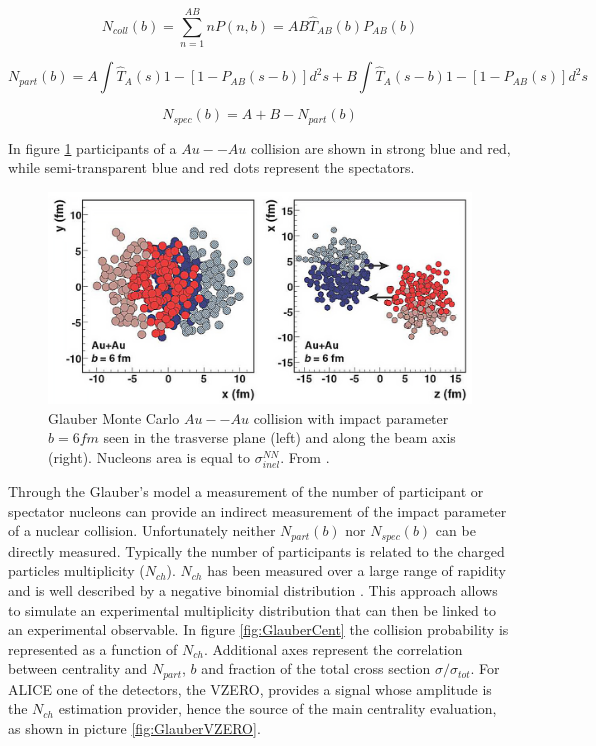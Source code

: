 \begin{equation}
\label{eq:Ncoll}
N_{coll}(b)=\sum_{n=1}^{AB}nP(n,b)=AB\hat{T}_{AB}(b)P_{AB}(b)
\end{equation}

\begin{equation}
\label{eq:Npart}
N_{part}(b)=A\int\hat{T}_A(s){1-[1-P_{AB}(s-b)]}d^2s + B\int\hat{T}_A(s-b){1-[1-P_{AB}(s)]}d^2s
\end{equation}

\begin{equation}
\label{eq:Nspec}
N_{spec}(b)=A+B-N_{part}(b)
\end{equation}

In figure \ref{fig:GlauberAuAu} participants of a $Au--Au$ collision are shown in strong blue and red, while semi-transparent blue and red dots represent the spectators.

\begin{figure}[!t]
\begin{center}
\includegraphics[width=0.9\linewidth]{Chapters/Analysis/Figs/glauber-pbpb.pdf}
\caption{Glauber Monte Carlo $Au--Au$ collision with impact parameter $b=6 fm$ seen in the trasverse plane (left) and along the beam axis (right). Nucleons area is equal to $\sigma_{inel}^{NN}$. From \cite{Miller:2007ri}.}
\label{fig:GlauberAuAu}
\end{center}
\end{figure}

Through the Glauber's model a measurement of the number of participant or spectator nucleons can provide an indirect measurement of the impact parameter of a nuclear collision.
Unfortunately neither $N_{part}(b)$ nor $N_{spec}(b)$ can be directly measured.
Typically the number of participants is related to the charged particles multiplicity ($N_{ch}$).
$N_{ch}$ has been measured over a large range of rapidity and is well described by a negative binomial distribution \cite{Aamodt:2009aa}.
This approach allows to simulate an experimental multiplicity distribution that can then be linked to an experimental observable.
In figure \ref{fig:GlauberCent} the collision probability is represented as a function of $N_{ch}$. Additional axes represent the correlation between centrality and $N_{part}$, $b$ and fraction of the total cross section $\sigma/\sigma_{tot}$.
For ALICE one of the detectors, the VZERO, provides a signal whose amplitude is the $N_{ch}$ estimation provider, hence the source of the main centrality evaluation, as shown in picture \ref{fig:GlauberVZERO}.


